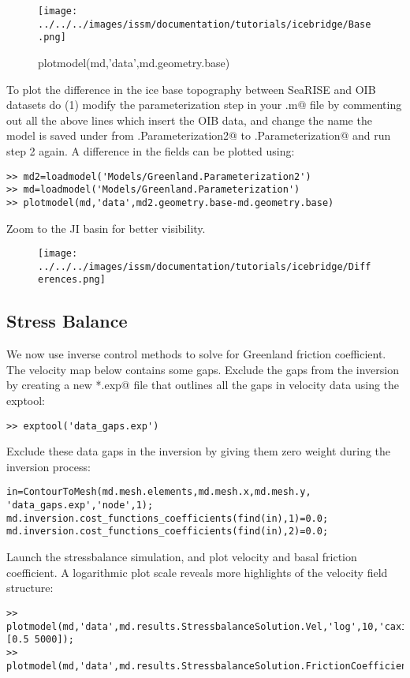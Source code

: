 \begin{figure}[H]
	\begin{center}
	\texttt{[image: ../../../images/issm/documentation/tutorials/icebridge/Base.png]}
	\caption{plotmodel(md,'data',md.geometry.base)}
	\end{center}
\end{figure}
To plot the difference in the ice base topography between SeaRISE and OIB datasets do (1) modify the parameterization step in your \verb@runme.m@ file by commenting out all the above lines which insert the OIB data, and change the name the model is saved under from \verb@Greenland.Parameterization2@ to \verb@Greenland.Parameterization@ and run step 2 again. A difference in the fields can be plotted using:
\begin{verbatim}>> md2=loadmodel('Models/Greenland.Parameterization2')
>> md=loadmodel('Models/Greenland.Parameterization')
>> plotmodel(md,'data',md2.geometry.base-md.geometry.base)\end{verbatim}
Zoom to the JI basin for better visibility.
\begin{figure}[H]
	\begin{center}
		\texttt{[image: ../../../images/issm/documentation/tutorials/icebridge/Differences.png]}
	\end{center}
\end{figure}
\subsection{Stress Balance} %
We now use inverse control methods to solve for Greenland friction coefficient. The velocity map below contains some gaps. Exclude the gaps from the inversion by creating a new \verb@*.exp@ file that outlines all the gaps in velocity data using the exptool:
\begin{verbatim}>> exptool('data_gaps.exp')\end{verbatim}

Exclude these data gaps in the inversion by giving them zero weight during the inversion process:
\begin{verbatim}in=ContourToMesh(md.mesh.elements,md.mesh.x,md.mesh.y, 'data_gaps.exp','node',1);
md.inversion.cost_functions_coefficients(find(in),1)=0.0;
md.inversion.cost_functions_coefficients(find(in),2)=0.0;\end{verbatim}

Launch the stressbalance simulation, and plot velocity and basal friction coefficient. A logarithmic
plot scale reveals more highlights of the velocity field structure:
\begin{verbatim}>> plotmodel(md,'data',md.results.StressbalanceSolution.Vel,'log',10,'caxis',[0.5 5000]);
>> plotmodel(md,'data',md.results.StressbalanceSolution.FrictionCoefficient);\end{verbatim}


